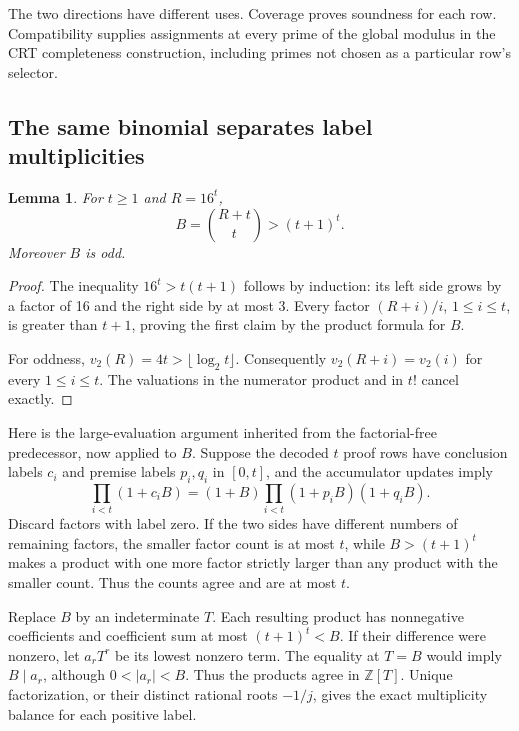 \documentclass[11pt]{article}
\newtheorem{lemma}[theorem]{Lemma}
\theoremstyle{remark}\newtheorem{remark}[theorem]{Remark}
\newcommand{\Z}{\mathbb Z}\newcommand{\N}{\mathbb N}
\newcommand{\abs}[1]{\lvert #1\rvert}
\begin{document}
The two directions have different uses. Coverage proves soundness for
each row. Compatibility supplies assignments at every prime of the
global modulus in the CRT completeness construction, including primes
not chosen as a particular row's selector.

\subsection{The same binomial separates label multiplicities}

\begin{lemma}\label{lem:binomial-growth}
For $t\ge1$ and $R=16^t$,
\[
 B=\binom{R+t}{t}>(t+1)^t.
\]
Moreover $B$ is odd.
\end{lemma}
\begin{proof}
The inequality $16^t>t(t+1)$ follows by induction: its left side
grows by a factor of 16 and the right side by at most 3. Every factor
$(R+i)/i$, $1\le i\le t$, is greater than $t+1$, proving the first
claim by the product formula for $B$.

For oddness, $v_2(R)=4t>\lfloor\log_2t\rfloor$. Consequently
$v_2(R+i)=v_2(i)$ for every $1\le i\le t$. The valuations in the
numerator product and in $t!$ cancel exactly.
\end{proof}

Here is the large-evaluation argument inherited from the factorial-free
predecessor, now applied to $B$. Suppose the decoded $t$ proof rows
have conclusion labels $c_i$ and premise labels $p_i,q_i$ in $[0,t]$,
and the accumulator updates imply
\begin{equation}\label{eq:balance}
 \prod_{i<t}(1+c_iB)
 =(1+B)\prod_{i<t}(1+p_iB)(1+q_iB).
\end{equation}
Discard factors with label zero. If the two sides have different numbers
of remaining factors, the smaller factor count is at most $t$, while
$B>(t+1)^t$ makes a product with one more factor strictly larger than
any product with the smaller count. Thus the counts agree and are at
most $t$.

Replace $B$ by an indeterminate $T$. Each resulting product has
nonnegative coefficients and coefficient sum at most $(t+1)^t<B$.
If their difference were nonzero, let $a_rT^r$ be its lowest nonzero
term. The equality at $T=B$ would imply $B\mid a_r$, although
$0<\abs{a_r}<B$. Thus the products agree in $\Z[T]$. Unique
factorization, or their distinct rational roots $-1/j$, gives the
exact multiplicity balance for each positive label.
\end{document}
